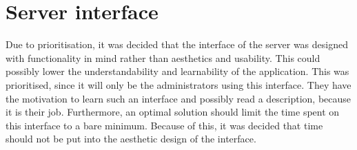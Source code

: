 \section{Server interface}\label{sec:serverInterface}
Due to prioritisation, it was decided that the interface of the server was designed with functionality in mind rather than aesthetics and usability. This could possibly lower the understandability and learnability of the application. This was prioritised, since it will only be the administrators using this interface. They have the motivation to learn such an interface and possibly read a description, because it is their job. Furthermore, an optimal solution should limit the time spent on this interface to a bare minimum. Because of this, it was decided that time should not be put into the aesthetic design of the interface.